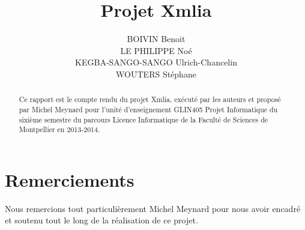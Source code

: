 \documentclass [a4 paper,11pt]{report}
\title {Projet Xmlia}
\author {
BOIVIN Benoit\\
LE PHILIPPE Noé\\
KEGBA-SANGO-SANGO Ulrich-Chancelin\\
WOUTERS Stéphane
}
\begin{document}
\maketitle

\begin{abstract}
Ce rapport est le compte rendu du projet Xmlia, exécuté par les auteurs et proposé par Michel Meynard pour l’unité d’enseignement GLIN405 Projet Informatique du sixième semestre du parcours Licence Informatique de la Faculté de Sciences de Montpellier en 2013-2014.
\end{abstract}

\chapter*{Remerciements}
Nous remercions tout particulièrement Michel Meynard pour nous avoir encadré et soutenu tout le long de la réalisation de ce projet.

\tableofcontents









\appendix
\end{document}
